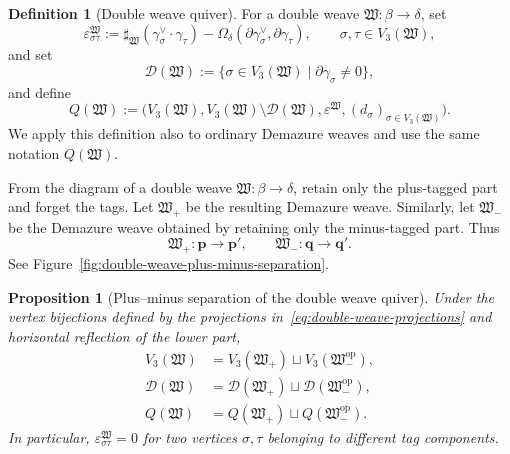 \documentclass[10pt,a4paper]{article}
\newtheorem{proposition}[theorem]{Proposition}
\theoremstyle{definition}
\newtheorem{definition}[theorem]{Definition}
\theoremstyle{remark}
\newcommand{\Dcal}{\mathcal D}
\newcommand{\eps}{\varepsilon}
\newcommand{\fW}{\mathfrak W}
\begin{document}
\begin{definition}[Double weave quiver]
\label{def:weave-quiver}
For a double weave \(\fW:\beta\to\delta\), set
\begin{equation}
 \eps^\fW_{\sigma\tau}
 :=\sharp_\fW(\gamma_\sigma^\vee\mathbin{\cdot}\gamma_\tau)
   -\Omega_\delta(\partial\gamma_\sigma^\vee,\partial\gamma_\tau),
 \qquad \sigma,\tau\in V_3(\fW),
 \label{eq:def-weave-quiver}
\end{equation}
and set
\begin{equation}
 \Dcal(\fW):=\{\sigma\in V_3(\fW)\mid\partial\gamma_\sigma\ne0\},
 \label{eq:weave-frozen-set}
\end{equation}
and define
\[
 Q(\fW):=
 \bigl(V_3(\fW),V_3(\fW)\setminus\Dcal(\fW),
       \eps^\fW,(d_\sigma)_{\sigma\in V_3(\fW)}\bigr).
\]
We apply this definition also to ordinary Demazure weaves and use the same
notation \(Q(\fW)\).
\end{definition}

From the diagram of a double weave \(\fW:\beta\to\delta\), retain only the
plus-tagged part and forget the tags.  Let \(\fW_+\) be the resulting Demazure
weave.  Similarly, let \(\fW_-\) be the Demazure weave obtained by retaining
only the minus-tagged part.  Thus
\begin{equation}
 \fW_+:\mathbf p\longrightarrow\mathbf p',
 \qquad
 \fW_-:\mathbf q\longrightarrow\mathbf q'.
 \label{eq:double-weave-projections}
\end{equation}
See Figure~\ref{fig:double-weave-plus-minus-separation}.

\begin{proposition}[Plus--minus separation of the double weave quiver]
\label{prop:double-weave-plus-minus-decomposition}
Under the vertex bijections defined by the projections
in~\eqref{eq:double-weave-projections} and horizontal reflection of the lower
part,
\begin{equation}
 \begin{aligned}
  V_3(\fW)
  &=V_3(\fW_+)\sqcup V_3(\fW_-^{\mathrm{op}}),\\
  \Dcal(\fW)
  &=\Dcal(\fW_+)\sqcup\Dcal(\fW_-^{\mathrm{op}}),\\
  Q(\fW)
  &=Q(\fW_+)\sqcup Q(\fW_-^{\mathrm{op}}).
 \end{aligned}
 \label{eq:double-weave-quiver-decomposition}
\end{equation}
In particular, \(\eps^\fW_{\sigma\tau}=0\) for two vertices \(\sigma,\tau\)
belonging to different tag components.
\end{proposition}
\end{document}
